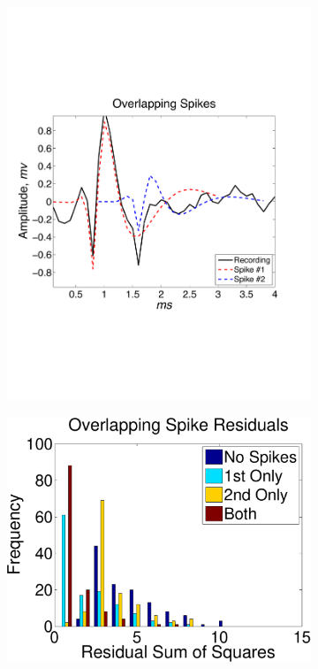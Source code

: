 \begin{center}
\begin{figure}[h!]
\begin{subfigure}[b]{.49\textwidth}
\includegraphics[width=\textwidth]{../figs/alloverlappingspikes/olspike3}
\caption{}
\label{overlapping}
\end{subfigure}
\begin{subfigure}[b]{.49\textwidth}
\includegraphics[width=\textwidth]{../figs/overlappingstat.pdf}

\end{subfigure}
\end{figure}
\end{center}

